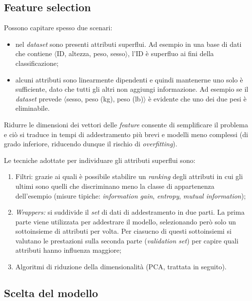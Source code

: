 \subsection{Feature selection}
Possono capitare spesso due scenari:
\begin{itemize}
\item nel \emph{dataset} sono presenti attributi superflui. Ad esempio in una base di dati che contiene $\langle$ID, altezza, peso, sesso$\rangle$, l'ID è superfluo ai fini della classificazione;
\item alcuni attributi sono linearmente dipendenti e quindi mantenerne uno solo è sufficiente, dato che tutti gli altri non aggiungi informazione. Ad esempio se il \emph{dataset} prevede $\langle$sesso, peso (kg), peso (lb)$\rangle$ è evidente che uno dei due pesi è eliminabile.
\end{itemize}

Ridurre le dimensioni dei vettori delle \emph{feature} consente di semplificare il problema e ciò si traduce in tempi di addestramento più brevi e modelli meno complessi (di grado inferiore, riducendo dunque il rischio di \emph{overfitting}).

Le tecniche adottate per individuare gli attributi superflui sono:
\begin{enumerate}
\item Filtri: grazie ai quali è possibile stabilire un \emph{ranking} degli attributi in cui gli ultimi sono quelli che discriminano meno la classe di appartenenza dell'esempio (misure tipiche: \emph{information gain}, \emph{entropy}, \emph{mutual information});
\item \emph{Wrappers:} si suddivide il \emph{set} di dati di addestramento in due parti. La prima parte viene utilizzata per addestrare il modello, selezionando però solo un sottoinsieme di attributi per volta. Per ciasucno di questi sottoinsiemi si valutano le prestazioni sulla seconda parte (\emph{validation set}) per capire quali attributi hanno influenza maggiore;
\item Algoritmi di riduzione della dimensionalità (PCA, trattata in seguito).
\end{enumerate}

\subsection{Scelta del modello}\label{sec:overunderfitting}
